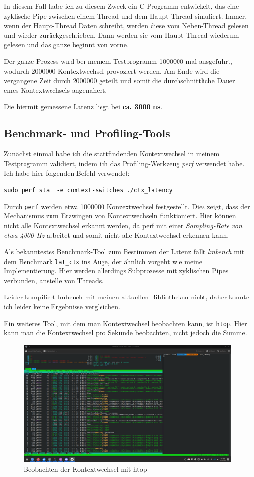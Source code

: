 \documentclass[12pt]{article}
\begin{document}
In diesem Fall habe ich zu diesem Zweck ein C-Programm entwickelt, das eine zyklische Pipe zwischen einem Thread und dem Haupt-Thread simuliert. Immer, wenn der Haupt-Thread Daten schreibt, werden diese vom Neben-Thread gelesen und wieder zurückgeschrieben. Dann werden sie vom Haupt-Thread wiederum gelesen und das ganze beginnt von vorne.

Der ganze Prozess wird bei meinem Testprogramm 1000000 mal ausgeführt, wodurch 2000000 Kontextwechsel provoziert werden. Am Ende wird die vergangene Zeit durch 2000000 geteilt und somit die durchschnittliche Dauer eines Kontextwechsels angenähert.

Die hiermit gemessene Latenz liegt bei \textbf{ca. 3000 ns}.

\subsection*{Benchmark- und Profiling-Tools}
Zunächst einmal habe ich die stattfindenden Kontextwechsel in meinem Testprogramm validiert, indem ich das Profiling-Werkzeug \emph{perf} verwendet habe. Ich habe hier folgenden Befehl verwendet:

\texttt{sudo perf stat -e context-switches ./ctx\_latency}

Durch \texttt{perf} werden etwa 1000000 Konzextwechsel festgestellt. Dies zeigt, dass der Mechanismus zum Erzwingen von Kontextwechseln funktioniert. Hier können nicht alle Kontextwechsel erkannt werden, da perf mit einer \emph{Sampling-Rate von etwa 4000 Hz} arbeitet und somit nicht alle Kontextwechsel erkennen kann.

Als bekanntestes Benchmark-Tool zum Bestimmen der Latenz fällt \emph{lmbench} mit dem Benchmark \texttt{lat\_ctx} ins Auge, der ähnlich vorgeht wie meine Implementierung. Hier werden allerdings Subprozesse mit zyklischen Pipes verbunden, anstelle von Threads.

Leider kompiliert lmbench mit meinen aktuellen Bibliotheken nicht, daher konnte ich leider keine Ergebnisse vergleichen.

Ein weiteres Tool, mit dem man Kontextwechsel beobachten kann, ist \texttt{htop}. Hier kann man die Kontextwechsel pro Sekunde beobachten, nicht jedoch die Summe.

\begin{figure}[H]
	\centering
	\includegraphics[width=\textwidth]{./img/screenshot_htop_ctx}
	\caption{Beobachten der Kontextwechsel mit htop}
\end{figure}
\end{document}
